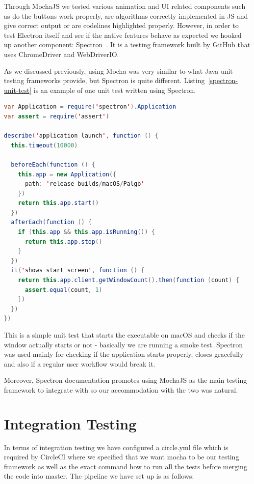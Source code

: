 \documentclass{l4proj}
\begin{document}
Through MochaJS we tested various animation and UI related components such as do the buttons work properly, are
algorithms correctly implemented in JS and give correct output or are codelines highlighted properly. However, in
order to test Electron itself and see if the native features behave as expected we hooked up another component:
Spectron~\cite{spectron}. It is a testing framework built by GitHub that uses ChromeDriver and WebDriverIO. 

As we discussed previously, using Mocha was very similar to what Java unit testing frameworks provide, but Spectron is
quite different. Listing~\ref{spectron-unit-test} is an example of one unit test written using Spectron.

\pagebreak

\begin{lstlisting}[language={Java}, label={spectron-unit-test}, caption={Spectron unit test which checks correct behaviour of the Electron
window.}]
var Application = require('spectron').Application
var assert = require('assert')

describe('application launch', function () {
  this.timeout(10000)

  beforeEach(function () {
    this.app = new Application({
      path: 'release-builds/macOS/Palgo'
    })
    return this.app.start()
  })
  afterEach(function () {
    if (this.app && this.app.isRunning()) {
      return this.app.stop()
    }
  })
  it('shows start screen', function () {
    return this.app.client.getWindowCount().then(function (count) {
      assert.equal(count, 1)
    })
  })
})
\end{lstlisting}

This is a simple unit test that starts the executable on macOS and checks if the window actually starts or not -
basically we are running a smoke test. Spectron was used mainly for checking if the application starts properly,
closes gracefully and also if a regular user workflow would break it.

Moreover, Spectron documentation promotes using MochaJS as the main testing framework to integrate with so our
accommodation with the two was natural.

\section{Integration Testing}

In terms of integration testing we have configured a circle.yml file which is required by CircleCI where we specified
that we want mocha to be our testing framework as well as the exact command how to run all the tests before merging
the code into master. The pipeline we have set up is as follows:
\end{document}

